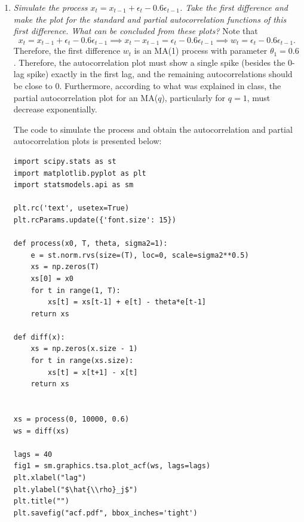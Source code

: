 \documentclass[fleqn]{article}
\begin{document}
\begin{enumerate}
\begin{verbatim}
# returns \hat{p}_j^j
def pacf(x, j, rs=None):
    if j == 1:
        return autocorr(x, j)
    else:
        if rs is None:
            rs = []
            for i in range(1, j+1):
                rs.append(autocorr(x, i))
            rs = np.reshape(rs, (len(rs), 1))

        return yule_walker(rs)[-1, 0]
        
for j in range(1, 4):
    print('rho_' + str(j) + str(j) + ':', pacf(x, j))
\end{verbatim}
and the estimated values are $\hat{\rho}_1^1=0.4545$, $\hat{\rho}_2^2=-0.5755$ and $\hat{\rho}_3^3=-0.2832$

\item \textit{Simulate the process $x_t=x_{t-1}+\epsilon_t-0.6\epsilon_{t-1}$. Take the first difference and make the plot for the standard and partial autocorrelation functions of this first difference. What can be concluded from these plots?}
Note that
\[
x_t=x_{t-1}+\epsilon_t-0.6\epsilon_{t-1} \implies x_t-x_{t-1}=\epsilon_t-0.6\epsilon_{t-1}\implies w_t=\epsilon_t-0.6\epsilon_{t-1}.
\]
Therefore, the first difference $w_t$ is an MA(1) process with parameter $\theta_1=0.6$. Therefore, the autocorrelation plot must show a single spike (besides the 0-lag spike) exactly in the first lag, and the remaining autocorrelations should be close to 0. Furthermore, according to what was explained in class, the partial autocorrelation plot for an MA($q$), particularly for $q=1$, must decrease exponentially.

The code to simulate the process and obtain the autocorrelation and partial autocorrelation plots is presented below:
\begin{verbatim}
import scipy.stats as st
import matplotlib.pyplot as plt
import statsmodels.api as sm

plt.rc('text', usetex=True)
plt.rcParams.update({'font.size': 15})

def process(x0, T, theta, sigma2=1):
    e = st.norm.rvs(size=(T), loc=0, scale=sigma2**0.5)
    xs = np.zeros(T)
    xs[0] = x0
    for t in range(1, T):
        xs[t] = xs[t-1] + e[t] - theta*e[t-1]
    return xs

def diff(x):
    xs = np.zeros(x.size - 1)
    for t in range(xs.size):
        xs[t] = x[t+1] - x[t]
    return xs


xs = process(0, 10000, 0.6)
ws = diff(xs)

lags = 40
fig1 = sm.graphics.tsa.plot_acf(ws, lags=lags)
plt.xlabel("lag")
plt.ylabel("$\hat{\\rho}_j$")
plt.title("")
plt.savefig("acf.pdf", bbox_inches='tight')


\end{verbatim}
\end{enumerate}
\end{document}
